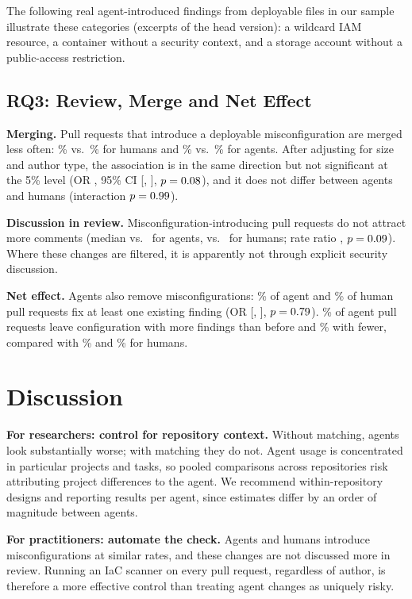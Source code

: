 \documentclass[10pt,conference]{IEEEtran}
\begin{document}


The following real agent-introduced findings from deployable files in our sample illustrate these categories (excerpts of the head version): a wildcard IAM resource, a container without a security context, and a storage account without a public-access restriction.



\subsection{RQ3: Review, Merge and Net Effect}
\textbf{Merging.} Pull requests that introduce a deployable misconfiguration are merged less often: \MergeHumanClean\% vs.\ \MergeHumanFind\% for humans and \MergeAgentClean\% vs.\ \MergeAgentFind\% for agents. After adjusting for size and author type, the association is in the same direction but not significant at the 5\% level (OR \MergeORFind, 95\% CI [\MergeORlo, \MergeORhi], $p=0.08$), and it does not differ between agents and humans (interaction $p=0.99$).

\textbf{Discussion in review.} Misconfiguration-introducing pull requests do not attract more comments (median \CommFindA{} vs.\ \CommCleanA{} for agents, \CommFindH{} vs.\ \CommCleanH{} for humans; rate ratio \IRRComm, $p=0.09$). Where these changes are filtered, it is apparently not through explicit security discussion.

\textbf{Net effect.} Agents also remove misconfigurations: \FixShareA\% of agent and \FixShareH\% of human pull requests fix at least one existing finding (OR \ORFix{} [\ORloFix, \ORhiFix], $p=0.79$). \NetWorseA\% of agent pull requests leave configuration with more findings than before and \NetBetterA\% with fewer, compared with \NetWorseH\% and \NetBetterH\% for humans.

\section{Discussion}
\textbf{For researchers: control for repository context.} Without matching, agents look substantially worse; with matching they do not. Agent usage is concentrated in particular projects and tasks, so pooled comparisons across repositories risk attributing project differences to the agent. We recommend within-repository designs and reporting results per agent, since estimates differ by an order of magnitude between agents.

\textbf{For practitioners: automate the check.} Agents and humans introduce misconfigurations at similar rates, and these changes are not discussed more in review. Running an IaC scanner on every pull request, regardless of author, is therefore a more effective control than treating agent changes as uniquely risky.
\end{document}
